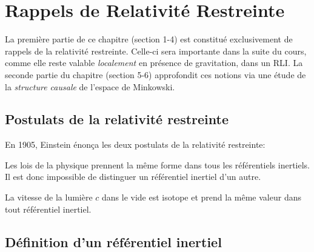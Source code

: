 {
\renewcommand\indexmarker{\cdot}


\chapter{Rappels de Relativité Restreinte}
La première partie de ce chapitre (section 1-4) est constitué exclusivement de rappels de la relativité restreinte. Celle-ci sera importante dans la suite du cours, comme elle reste valable \emph{localement} en présence de gravitation, dans un RLI. La seconde partie du chapitre (section 5-6) approfondit ces notions via une étude de la \emph{structure causale} de l'espace de Minkowski.


\section{Postulats de la relativité restreinte}
En 1905, Einstein énonça les deux postulats de la relativité restreinte:
\begin{theoremframe}
    \begin{post}
        Les lois de la physique prennent la même forme dans tous les référentiels inertiels. Il est donc impossible de distinguer un référentiel inertiel d'un autre.
    \end{post}
\end{theoremframe}
\begin{theoremframe}
    \begin{post}
        La vitesse de la lumière $c$ dans le vide est isotope et prend la même valeur dans tout référentiel inertiel.
    \end{post}
\end{theoremframe}
\section{Définition d'un référentiel inertiel}

}
